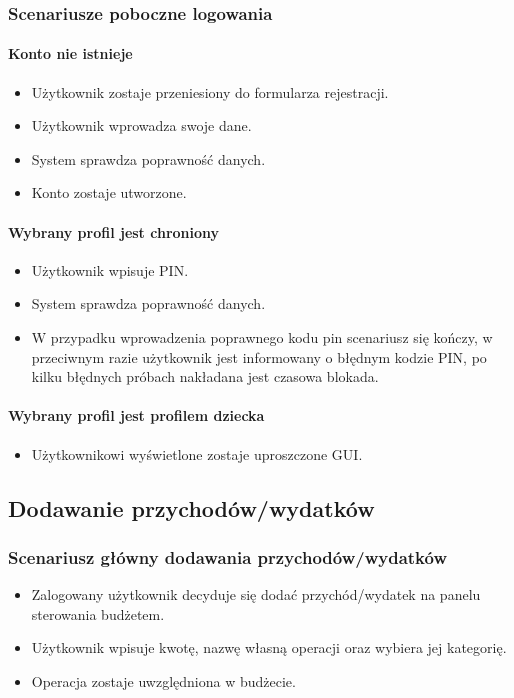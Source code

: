 \documentclass[12pt,a4paper,oneside]{article}
\begin{document}
\subsubsection{Scenariusze poboczne logowania}
\paragraph{Konto nie istnieje}
\begin{itemize}
    \item Użytkownik zostaje przeniesiony do formularza rejestracji.
    \item Użytkownik wprowadza swoje dane.
    \item System sprawdza poprawność danych.
    \item Konto zostaje utworzone.
\end{itemize}

\paragraph{Wybrany profil jest chroniony}
\begin{itemize}
    \item Użytkownik wpisuje PIN.
    \item System sprawdza poprawność danych.
    \item W przypadku wprowadzenia poprawnego kodu pin scenariusz się kończy,
          w przeciwnym razie użytkownik jest informowany o błędnym kodzie PIN,
          po kilku błędnych próbach nakładana jest czasowa blokada.
\end{itemize}

\paragraph{Wybrany profil jest profilem dziecka}
\begin{itemize}
    \item Użytkownikowi wyświetlone zostaje uproszczone GUI.
\end{itemize}

\subsection{Dodawanie przychodów/wydatków}
\subsubsection{Scenariusz główny dodawania przychodów/wydatków}
\begin{itemize}
    \item Zalogowany użytkownik decyduje się dodać przychód/wydatek na panelu
          sterowania budżetem.
    \item Użytkownik wpisuje kwotę, nazwę własną operacji oraz wybiera jej
          kategorię.
    \item Operacja zostaje uwzględniona w budżecie.
\end{itemize}
\end{document}
